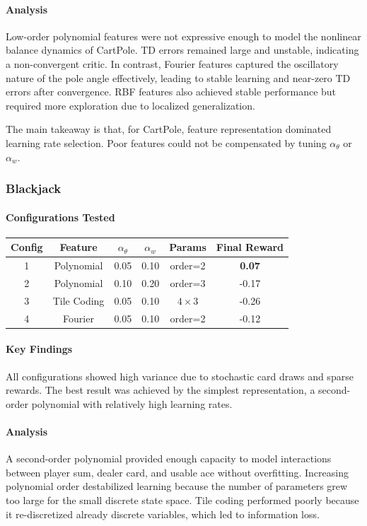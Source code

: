 \documentclass{article}
\begin{document}
\paragraph{Analysis}
Low-order polynomial features were not expressive enough to model the nonlinear balance dynamics of CartPole. TD errors remained large and unstable, indicating a non-convergent critic. In contrast, Fourier features captured the oscillatory nature of the pole angle effectively, leading to stable learning and near-zero TD errors after convergence. RBF features also achieved stable performance but required more exploration due to localized generalization.

The main takeaway is that, for CartPole, feature representation dominated learning rate selection. Poor features could not be compensated by tuning $\alpha_\theta$ or $\alpha_w$.

\subsubsection{Blackjack}

\paragraph{Configurations Tested}
\begin{center}
\begin{tabular}{c c c c c c}
\hline
Config & Feature & $\alpha_\theta$ & $\alpha_w$ & Params & Final Reward \\
\hline
1 & Polynomial & 0.05 & 0.10 & order=2 & \textbf{0.07} \\
2 & Polynomial & 0.10 & 0.20 & order=3 & -0.17 \\
3 & Tile Coding & 0.05 & 0.10 & $4\times3$ & -0.26 \\
4 & Fourier & 0.05 & 0.10 & order=2 & -0.12 \\
\hline
\end{tabular}
\end{center}

\paragraph{Key Findings}
All configurations showed high variance due to stochastic card draws and sparse rewards. The best result was achieved by the simplest representation, a second-order polynomial with relatively high learning rates.

\paragraph{Analysis}
A second-order polynomial provided enough capacity to model interactions between player sum, dealer card, and usable ace without overfitting. Increasing polynomial order destabilized learning because the number of parameters grew too large for the small discrete state space. Tile coding performed poorly because it re-discretized already discrete variables, which led to information loss.   
\end{document}
